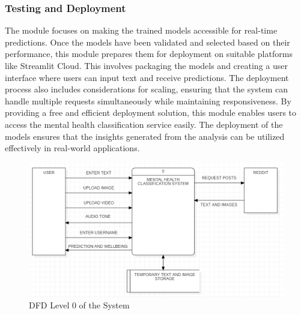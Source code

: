 \subsubsection{Testing and Deployment}
\noindent
The module focuses on making the trained models accessible for real-time predictions. Once the models have been validated and selected based on their performance, this module prepares them for deployment on suitable platforms like Streamlit Cloud. This involves packaging the models and creating a user interface where users can input text and receive predictions. The deployment process also includes considerations for scaling, ensuring that the system can handle multiple requests simultaneously while maintaining responsiveness. By providing a free and efficient deployment solution, this module enables users to access the mental health classification service easily. The deployment of the models ensures that the insights generated from the analysis can be utilized effectively in real-world applications.

\begin{figure}[h!]  
    \centering
    \includegraphics[width=1.0\textwidth]{Images/DFD L0.png}  
    \caption{DFD Level 0 of the System}
    \label{dfdl0}  %
\end{figure}


